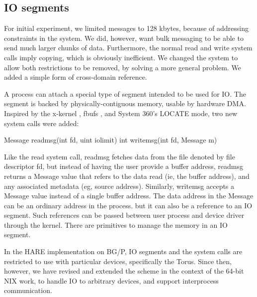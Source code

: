 \subsection{IO segments}

For initial experiment, we limited messages to 128 kbytes, because of
addressing constraints in the system. We did, however, want bulk messaging
to be able to send much larger chunks of data.
Furthermore, the normal read and write system calls imply copying,
which is obviously inefficient.
We changed the system to allow both restrictions to be removed,
by solving a more general problem. We added a simple form of cross-domain reference.

A process can attach a special type of segment intended to be used for IO.
The segment is backed by physically-contiguous memory, usable by hardware DMA.
Inspired by the x-kernel \cite{x-kernel}, fbufs \cite{fbufs}, and System 360's LOCATE mode, two new system calls were added:


\begin{center}
      Message readmsg(int fd, uint iolimit)
      int writemsg(int fd, Message m)
\end{center}

Like the read system call, readmsg fetches data from the file denoted by file descriptor fd,
but instead of having the user provide a buffer address, readmsg returns a Message value
that refers to the data read (ie, the buffer address), and any associated metadata (eg, source address). Similarly, writemsg accepts a Message value instead of a single buffer address.
The data address in the Message can be an ordinary address in the process.
but it can also be a reference to an IO segment.
Such references can be passed between user process and device driver through the kernel.
There are primitives to manage the memory in an IO segment.

In the HARE implementation on BG/P, IO segments and the system calls are restricted to use with particular devices, specifically the Torus.
Since then, however, we have revised and extended the scheme in the context of the 64-bit NIX work,
to handle IO to arbitrary devices, and support interprocess communication.

